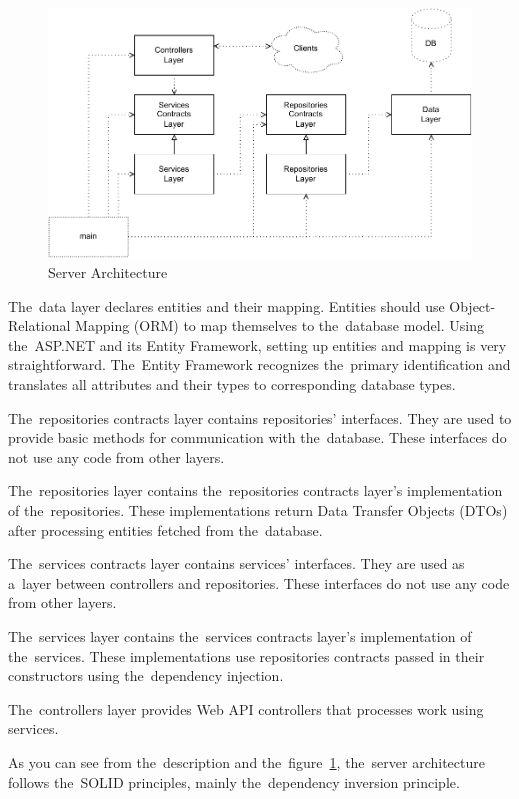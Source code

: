 \begin{figure}
    \centering
    \includegraphics[width=1\linewidth]{assets/design/serverarchitecture.pdf}
    \caption{Server Architecture}
    \label{fig:design:serverarchitecture}
\end{figure}

The~data layer declares entities and their mapping.
Entities should use Object-Relational Mapping (ORM) to map themselves to the~database model.
Using the~ASP.NET and its Entity Framework, setting up entities and mapping is very straightforward.
The~Entity Framework recognizes the~primary identification and translates all attributes and their types to corresponding database types.

The~repositories contracts layer contains repositories' interfaces.
They are used to provide basic methods for communication with the~database.
These interfaces do not use any code from other layers.

The~repositories layer contains the~repositories contracts layer's implementation of the~repositories.
These implementations return Data Transfer Objects (DTOs) after processing entities fetched from the~database.

The~services contracts layer contains services' interfaces.
They are used as a~layer between controllers and repositories.
These interfaces do not use any code from other layers.

The~services layer contains the~services contracts layer's implementation of the~services.
These implementations use repositories contracts passed in their constructors using the~dependency injection.

The~controllers layer provides Web API controllers that processes work using services.

As you can see from the~description and the~figure~\ref{fig:design:serverarchitecture}, the~server architecture follows the~SOLID principles, mainly the~dependency inversion principle.

